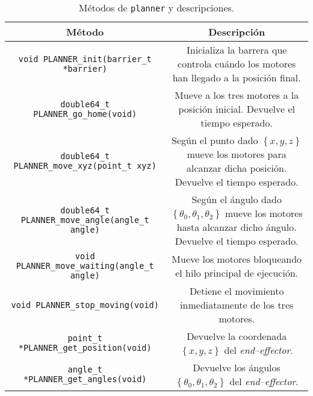 \begin{longtable}{C{1} | C{0.5}}
    \caption{Métodos de \texttt{planner} y descripciones.}
    \label{tab:planner_def}
    \endfirsthead
    \endhead
    \hline
    \textbf{Método} & \textbf{Descripción} \\
    \hline
    \lstinline[style=C]!void PLANNER_init(barrier_t *barrier)! & Inicializa la barrera que controla cuándo los motores han llegado a la posición final. \\
    \hline
    \lstinline[style=C]!double64_t PLANNER_go_home(void)! & Mueve a los tres motores a la posición inicial. Devuelve el tiempo esperado. \\
    \hline
    \lstinline[style=C]!double64_t PLANNER_move_xyz(point_t xyz)! & Según el punto dado $\left\{x, y, z\right\}$ mueve los motores para alcanzar dicha posición. Devuelve el tiempo esperado. \\
    \hline
    \lstinline[style=C]!double64_t PLANNER_move_angle(angle_t angle)! & Según el ángulo dado $\left\{\theta_0, \theta_1, \theta_2\right\}$ mueve los motores hasta alcanzar dicho ángulo. Devuelve el tiempo esperado. \\
    \hline
    \lstinline[style=C]!void PLANNER_move_waiting(angle_t angle)! & Mueve los motores bloqueando el hilo principal de ejecución. \\
    \hline
    \lstinline[style=C]!void PLANNER_stop_moving(void)! & Detiene el movimiento inmediatamente de los tres motores. \\
    \hline
    \lstinline[style=C]!point_t *PLANNER_get_position(void)! & Devuelve la coordenada $\left\{x, y, z\right\}$ del \textit{end--effector}. \\
    \hline
    \lstinline[style=C]!angle_t *PLANNER_get_angles(void)! & Devuelve los ángulos $\left\{\theta_0, \theta_1, \theta_2\right\}$ del \textit{end--effector}.
\end{longtable}